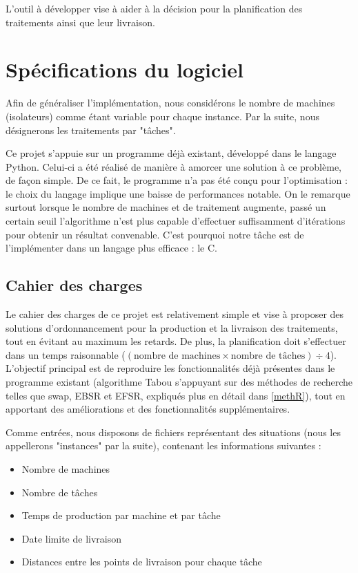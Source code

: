 \documentclass[hideweeklyreports]{polytech/polytech}
\begin{document}
		L'outil à développer vise à aider à la décision pour la planification des traitements ainsi que leur livraison.
		
	\chapter{Spécifications du logiciel}
		Afin de généraliser l'implémentation, nous considérons le nombre de machines (isolateurs) comme étant variable pour chaque instance. Par la suite, nous désignerons les traitements par "tâches".
		
		Ce projet s'appuie sur un programme déjà existant, développé dans le langage Python. Celui-ci a été réalisé de manière à amorcer une solution à ce problème, de façon simple. De ce fait, le programme n'a pas été conçu pour l'optimisation : le choix du langage implique une baisse de performances notable. On le remarque surtout lorsque le nombre de machines et de traitement augmente, passé un certain seuil l'algorithme n'est plus capable d'effectuer suffisamment d'itérations pour obtenir un résultat convenable. C'est pourquoi notre tâche est de l'implémenter dans un langage plus efficace : le C.
		\section{Cahier des charges}
			Le cahier des charges de ce projet est relativement simple et vise à proposer des solutions d'ordonnancement pour la production et la livraison des traitements, tout en évitant au maximum les retards. De plus, la planification doit s'effectuer dans un temps raisonnable ($(\text{nombre de machines}\times \text{nombre de tâches})\div 4$). L'objectif principal est de reproduire les fonctionnalités déjà présentes dans le programme existant (algorithme Tabou s'appuyant sur des méthodes de recherche telles que swap, EBSR et EFSR, expliqués plus en détail dans \autoref{methR}), tout en apportant des améliorations et des fonctionnalités supplémentaires.
			
			Comme entrées, nous disposons de fichiers représentant des situations (nous les appellerons "instances" par la suite), contenant les informations suivantes :
			\begin{itemize}
				\item Nombre de machines
				\item Nombre de tâches
				\item Temps de production par machine et par tâche
				\item Date limite de livraison
				\item Distances entre les points de livraison pour chaque tâche
			\end{itemize}
			
\end{document}
